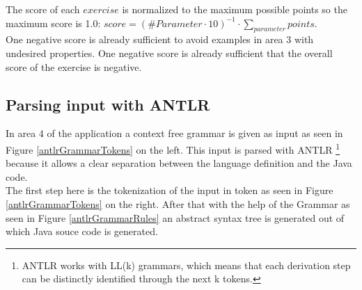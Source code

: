 \noindent The score of each $exercise$ is normalized to the maximum possible points so the maximum score is 1.0: $score = (\#Parameter\cdot10)^{-1}\cdot\sum\limits_{parameter}^{}points$. \\
One negative score is already sufficient to avoid examples in area 3 with undesired properties. One negative score is already sufficient that the overall score of the exercise is negative.
\pagebreak

\subsection{Parsing input with ANTLR}
In area 4 of the application a context free grammar is given as input as seen in Figure \ref{antlrGrammarTokens} on the left. This input is parsed with ANTLR \footnote{ANTLR works with LL(k) grammars, which means that each derivation step can be distinctly identified through the next k tokens.} because it allows a clear separation between the language definition and the Java code.\\
The first step here is the tokenization of the input in token as seen in Figure \ref{antlrGrammarTokens} on the right. After that with the help of the Grammar as seen in Figure \ref{antlrGrammarRules} an abstract syntax tree is generated out of which Java souce code is generated.\\
\noindent
